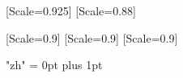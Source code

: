 \usepackage{xeCJK}

\setmainfont{Linux Libertine O}[Scale=0.925]
\setmonofont{Consolas}[Scale=0.88]

[Scale=0.9]
[Scale=0.9]
[Scale=0.9]

\XeTeXlinebreaklocale "zh"
\XeTeXlinebreakskip = 0pt plus 1pt
